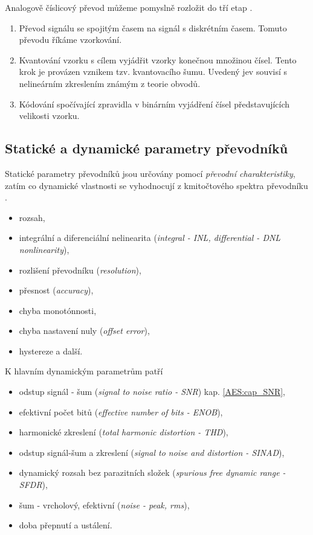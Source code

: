       Analogově číslicový převod můžeme pomyslně rozložit do tří etap \cite{Sebesta}.
      \begin{enumerate}
        \item Převod signálu se spojitým časem na signál s diskrétním časem. Tomuto převodu říkáme vzorkování.
        \item Kvantování vzorku s cílem vyjádřit vzorky konečnou množinou čísel. Tento krok je provázen    
              vznikem tzv. kvantovacího šumu. Uvedený jev souvisí s nelineárním zkreslením známým z teorie 
              obvodů.
        \item Kódování spočívající zpravidla v binárním vyjádření čísel představujících velikosti vzorku.
      \end{enumerate}
      
    \subsection{Statické a dynamické parametry převodníků}
      Statické parametry převodníků jsou určovány pomocí \emph{převodní charakteristiky}, zatím co dynamické vlastnosti se vyhodnocují z kmitočtového spektra převodníku \cite[s.~11]{Haze}.
      \begin{itemize}
        \item rozsah,
        \item integrální a diferenciální nelinearita (\emph{integral - INL, differential - DNL nonlinearity}),
        \item rozlišení převodníku (\emph{resolution}),
        \item přesnost (\emph{accuracy}),
        \item chyba monotónnosti,
        \item chyba nastavení nuly (\emph{offset error}),
        \item hystereze a další.
       \end{itemize}
       K hlavním dynamickým parametrům patří
       \begin{itemize}
         \item odstup signál - šum (\emph{signal to noise ratio - SNR}) kap. \ref{AES:cap_SNR},
         \item efektivní počet bitů (\emph{effective number of bits - ENOB}),
         \item harmonické zkreslení (\emph{total harmonic distortion - THD}),
         \item odstup signál-šum a zkreslení (\emph{signal to noise and distortion - SINAD}),
         \item dynamický rozsah bez parazitních složek \newline(\emph{spurious free dynamic range - SFDR}),
         \item šum - vrcholový, efektivní (\emph{noise - peak, rms}),
         \item doba přepnutí a ustálení.
       \end{itemize}

